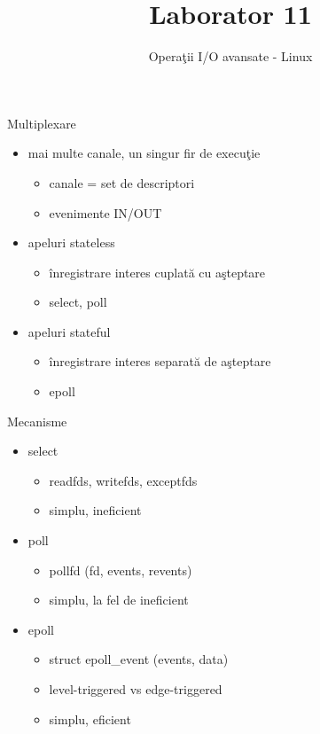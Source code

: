 \documentclass{so.cs.pub.ro}
\title[Laborator 11]{Laborator 11}
\subtitle{Operaţii I/O avansate - Linux}
\begin{document}
\frame{\titlepage}


\begin{frame}{Multiplexare}
\begin{itemize}
  \item mai multe canale, un singur fir de execuţie
  \begin{itemize}
    \item canale = set de descriptori
    \item evenimente IN/OUT
  \end{itemize}
  \item apeluri stateless
  \begin{itemize}
    \item înregistrare interes cuplată cu aşteptare
    \item select, poll
  \end{itemize}
  \item apeluri stateful
  \begin{itemize}
    \item înregistrare interes separată de aşteptare
    \item epoll
  \end{itemize}
\end{itemize}
\end{frame}

\begin{frame}{Mecanisme}
  \begin{itemize}    %
    \item select
      \begin{itemize}
        \item readfds, writefds, exceptfds
        \item simplu, ineficient
      \end{itemize}
    \item poll
      \begin{itemize}
        \item pollfd (fd, events, revents)
        \item simplu, la fel de ineficient
      \end{itemize}
    \item epoll
      \begin{itemize}
        \item struct epoll_event (events, data)
        \item level-triggered vs edge-triggered
        \item simplu, eficient
      \end{itemize}
  \end{itemize}
\end{frame}
\end{document}
